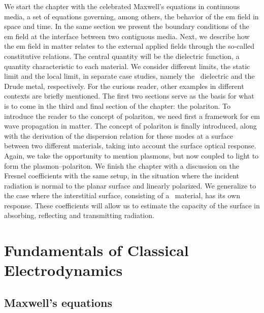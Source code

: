 We start the chapter with the celebrated Maxwell's equations in continuous media, a set of equations governing, among others, the behavior of the \gls{em} field in space and time.
In the same section we present the boundary conditions of the \gls{em} field at the interface between two contiguous media.
Next, we describe how the \gls{em} field in matter relates to the external applied fields through the so-called constitutive relations.
The central quantity will be the dielectric function, a quantity characteristic to each material.
We consider different limits, the static limit and the local limit, in separate case studies, namely the \bd~dielectric and the Drude metal, respectively.
For the curious reader, other examples in different contexts are briefly mentioned.
The first two sections serve as the basis for what is to come in the third and final section of the chapter: the polariton.
To introduce the reader to the concept of polariton, we need first a framework for \gls{em} wave propagation in matter. %
The concept of polariton is finally introduced, along with the derivation of the dispersion relation for these modes at a surface between two different materials, taking into account the surface optical response.
Again, we take the opportunity to mention plasmons, but now coupled to light to form the plasmon--polariton.
We finish the chapter with a discussion on the Fresnel coefficients with the same setup, in the situation where the incident radiation is normal to the planar surface and linearly polarized.
We generalize to the case where the interstitial surface, consisting of a \bd~material, has its own response.
These coefficients will allow us to estimate the capacity of the surface in absorbing, reflecting and transmitting radiation.

\section{Fundamentals of Classical Electrodynamics}
\label{sec:CED_fundaments}

\newcommand{\f}{\mathrm{f}}
\renewcommand{\b}{\mathrm{b}}

\subsection{Maxwell's equations}
\label{subsec:maxwell_equations}


